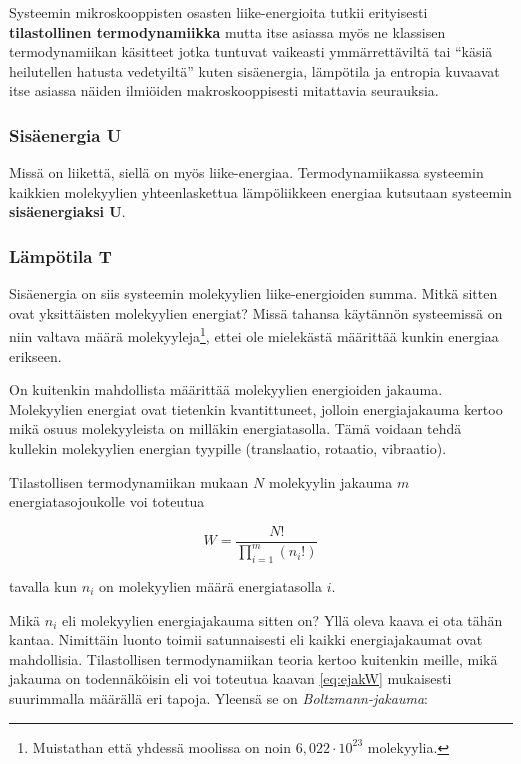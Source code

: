 \documentclass[12pt,a4paper,finnish]{book}
\begin{document}
Systeemin mikroskooppisten osasten liike-energioita tutkii erityisesti \textbf{tilastollinen termodynamiikka} mutta itse asiassa 
myös ne klassisen termodynamiikan käsitteet jotka tuntuvat vaikeasti ymmärrettäviltä tai ``käsiä heilutellen hatusta vedetyiltä'' 
kuten sisäenergia, lämpötila ja entropia kuvaavat itse asiassa näiden ilmiöiden makroskooppisesti mitattavia seurauksia.

\subsubsection{Sisäenergia U}

Missä on liikettä, siellä on myös liike-energiaa. Termodynamiikassa systeemin kaikkien molekyylien yhteenlaskettua lämpöliikkeen 
energiaa kutsutaan systeemin \textbf{sisäenergiaksi U}. 

\subsubsection{Lämpötila T} \label{sssection:T}

Sisäenergia on siis systeemin molekyylien liike-energioiden summa. Mitkä sitten ovat yksittäisten molekyylien energiat? 
Missä tahansa käytännön systeemissä on niin valtava määrä molekyyleja\footnote{Muistathan että yhdessä moolissa on 
noin $6,022\cdot10^{23}$ molekyylia.}, ettei ole mielekästä määrittää kunkin energiaa erikseen.

On kuitenkin mahdollista määrittää molekyylien energioiden jakauma. Molekyylien energiat ovat tietenkin kvantittuneet, 
jolloin energiajakauma kertoo mikä osuus molekyyleista on milläkin energiatasolla. Tämä voidaan tehdä kullekin molekyylien 
energian tyypille (translaatio, rotaatio, vibraatio).

Tilastollisen termodynamiikan mukaan $N$ molekyylin jakauma $m$ energiatasojoukolle voi toteutua

\begin{equation}
\label{eq:ejakW}
 W = \frac{N!}{\prod_{i=1}^m(n_i!)}
\end{equation}

tavalla kun $n_i$ on molekyylien määrä energiatasolla $i$.

Mikä $n_i$ eli molekyylien energiajakauma sitten on? Yllä oleva kaava ei ota tähän kantaa. 
Nimittäin luonto toimii satunnaisesti eli kaikki energiajakaumat ovat mahdollisia. Tilastollisen termodynamiikan 
teoria kertoo kuitenkin meille, mikä jakauma on todennäköisin eli voi toteutua kaavan \ref{eq:ejakW} mukaisesti 
suurimmalla määrällä eri tapoja. Yleensä se on \textit{Boltzmann-jakauma}:
\end{document}
